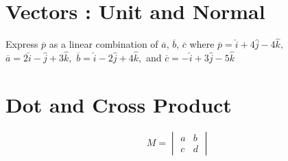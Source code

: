 \documentclass[17pt]{extarticle}
\begin{document}
\section{Vectors : Unit and Normal}
Express $\overline{p}$ as a linear combination of 
$\overline{a}$, $\overline{b}$, $\overline{c}$ where 
$\overline{p} =\hat{i} + 4\hat{j} - 4\hat{k},$
$\overline{a} =2\hat{i} - \hat{j} + 3\hat{k},$ 
$\overline{b} =\hat{i} - 2\hat{j} + 4\hat{k},$ \; and \;
$\overline{c} =-\hat{i} + 3\hat{j} - 5\hat{k} $

\section{Dot and Cross Product}
\[ M = \begin{vmatrix} a&b\\ c&d \end{vmatrix}\]
\end{document}
